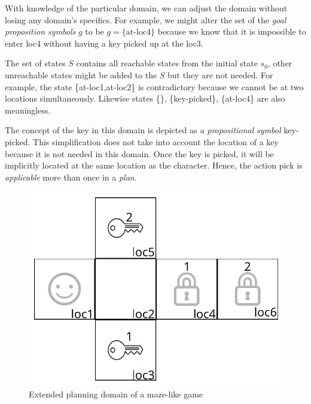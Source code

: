 \medskip\noindent
With knowledge of the particular domain, we can adjust the domain without losing any domain's specifics. For example, we might alter the set of the \emph{goal proposition symbols} $g$ to be $g=\mathrm{\{at\text{-}loc4\}}$ because we know that it is impossible to enter loc4 without having a key picked up at the loc3.

\medskip\noindent
The set of states $S$ contains all reachable states from the initial state $s_0$, other unreachable states might be added to the $S$ but they are not needed. For example, the state \{at-loc1,at-loc2\} is contradictory because we cannot be at two locations simultaneously. Likewise states \{\}, \{key-picked\}, \{at-loc4\} are also meaningless.

\medskip\noindent
The concept of the key in this domain is depicted as \emph{a propositional symbol} key-picked. This simplification does not take into account the location of a key because it is not needed in this domain. Once the key is picked, it will be implicitly located at the same location as the character. Hence, the action pick is \emph{applicable} more than once in a \emph{plan}.

\begin{figure}
    \centering
    \includegraphics{img/output_mares_key2.pdf}
    \caption{Extended planning domain of a maze-like game}
    \label{fig01:2}
\end{figure}

